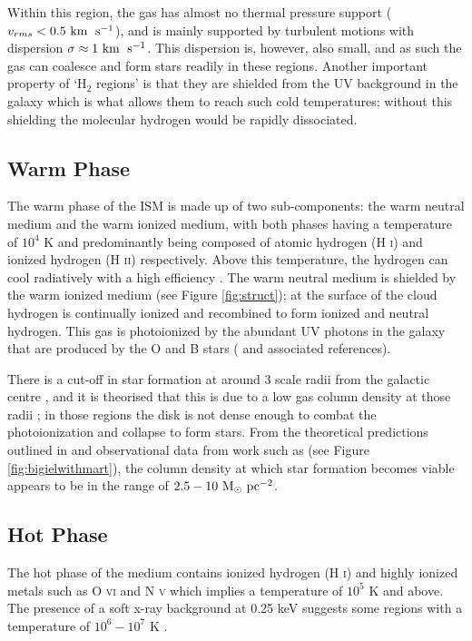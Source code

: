 Within this region, the gas has almost no thermal pressure support ($v_{rms} < 0.5 ~\mathrm{km}\;~\mathrm{s}^{-1}$), and is mainly supported by turbulent motions \citep{larson_turbulence_1981, solomon_mass_1987, heyer_universality_2004} with dispersion $\sigma \approx 1 ~\mathrm{km}\;~\mathrm{s}^{-1}$.
This dispersion is, however, also small, and as such the gas can coalesce and form stars readily in these regions.
Another important property of `H$_2$ regions' is that they are shielded from the UV background in the galaxy which is what allows them to reach such cold temperatures; without this shielding the molecular hydrogen would be rapidly dissociated. 

\subsection{Warm Phase}

The warm phase of the ISM is made up of two sub-components: the warm neutral medium and the warm ionized medium, with both phases having a temperature of $10^4$ K and predominantly being composed of atomic hydrogen (H \textsc{i}) and ionized hydrogen (H \textsc{ii}) respectively.
Above this temperature, the hydrogen can cool radiatively with a high efficiency \citep{gnat_time-dependent_2007}.
The warm neutral medium is shielded by the warm ionized medium (see Figure \ref{fig:struct}); at the surface of the cloud hydrogen is continually ionized and recombined to form ionized and neutral hydrogen.
This gas is photoionized by the abundant UV photons in the galaxy that are produced by the O and B stars (\citet{lefloch_photoionization_2002} and associated references).

There is a cut-off in star formation at around 3 scale radii from the galactic centre \citep{kennicutt_star_1989, martin_star_2001}, and it is theorised that this is due to a low gas column density at those radii \citep{schaye_star_2004}; in those regions the disk is not dense enough to combat the photoionization and collapse to form stars.
From the theoretical predictions outlined in \citet{schaye_star_2004} and observational data from work such as \citet{bigiel_star_2008} (see Figure \ref{fig:bigielwithmart}), the column density at which star formation becomes viable appears to be in the range of $2.5 - 10 ~\mathrm{M}_{\odot} ~\mathrm{pc}^{-2}$.

\subsection{Hot Phase}

The hot phase of the medium contains ionized hydrogen (H \textsc{i}) and highly ionized metals such as O \textsc{vi} and N \textsc{v} which implies a temperature of $10^{5}$ K and above. The presence of a soft x-ray background at 0.25 keV suggests some regions with a temperature of $10^6 - 10^7$ K \citep{ferriere_interstellar_2001}.

